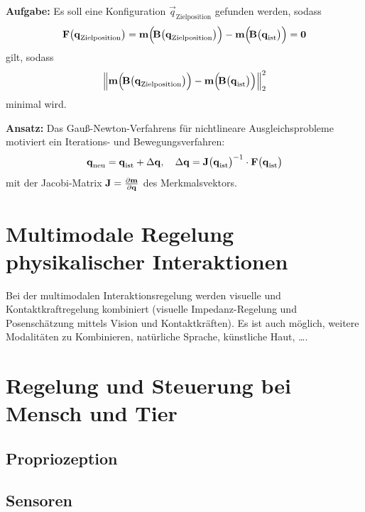 			\textbf{Aufgabe:}
			Es soll eine Konfiguration \( \vec{q}_\text{Zielposition} \) gefunden werden, sodass
			\begin{equation*}
				\boldsymbol{\mathrm{F}}\big(\boldsymbol{\mathrm{q}}_\text{Zielposition}\big) = \boldsymbol{\mathrm{m}}\Big(\!\boldsymbol{\mathrm{B}}\big(\boldsymbol{\mathrm{q}}_\text{Zielposition}\big)\Big) - \boldsymbol{\mathrm{m}}\Big(\!\boldsymbol{\mathrm{B}}\big(\boldsymbol{\mathrm{q}}_\text{ist}\big)\Big) = \boldsymbol{\mathrm{0}}
			\end{equation*}
			gilt, \bzw sodass
			\begin{equation*}
				\Big\lVert \boldsymbol{\mathrm{m}}\Big(\!\boldsymbol{\mathrm{B}}\big(\boldsymbol{\mathrm{q}}_\text{Zielposition}\big)\Big) - \boldsymbol{\mathrm{m}}\Big(\!\boldsymbol{\mathrm{B}}\big(\boldsymbol{\mathrm{q}}_\text{ist}\big)\Big) \Big\rVert_2^2
			\end{equation*}
			minimal wird.
			
			\textbf{Ansatz:}
			Das Gauß-Newton-Verfahrens für nichtlineare Ausgleichsprobleme motiviert ein Iterations- und Bewegungsverfahren:
			\begin{equation*}
				\boldsymbol{\mathrm{q}}_\text{neu} = \boldsymbol{\mathrm{q}}_\text{ist} + \Delta\boldsymbol{\mathrm{q}},\quad \Delta\boldsymbol{\mathrm{q}} = \boldsymbol{\mathrm{J}}\big(\boldsymbol{\mathrm{q}}_\text{ist}\big)^{-1} \cdot \boldsymbol{\mathrm{F}}\big(\boldsymbol{\mathrm{q}}_\text{ist}\big)
			\end{equation*}
			mit der Jacobi-Matrix \( \boldsymbol{\mathrm{J}} = \frac{\partial \boldsymbol{\mathrm{m}}}{\partial \boldsymbol{\mathrm{q}}} \) des Merkmalsvektors.

	\section{Multimodale Regelung physikalischer Interaktionen}
		Bei der multimodalen Interaktionsregelung werden \zB visuelle und Kontaktkraftregelung kombiniert (\zB visuelle Impedanz-Regelung und Posenschätzung mittels Vision und Kontaktkräften). Es ist auch möglich, weitere Modalitäten zu Kombinieren, \zB natürliche Sprache, künstliche Haut, \dots.

	\section{Regelung und Steuerung bei Mensch und Tier} %

		\subsection{Propriozeption} %

		\subsection{Sensoren} %

